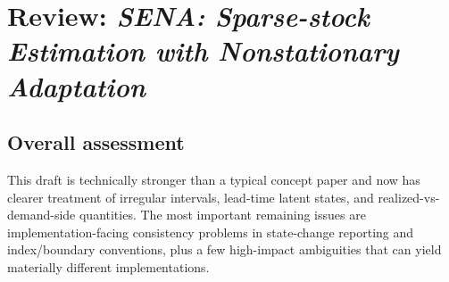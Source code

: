 \documentclass[11pt]{article}
\begin{document}
\section*{Review: \textit{SENA: Sparse-stock Estimation with Nonstationary Adaptation}}

\subsection*{Overall assessment}
This draft is technically stronger than a typical concept paper and now has clearer treatment of irregular intervals, lead-time latent states, and realized-vs-demand-side quantities. The most important remaining issues are implementation-facing consistency problems in state-change reporting and index/boundary conventions, plus a few high-impact ambiguities that can yield materially different implementations.
\end{document}
